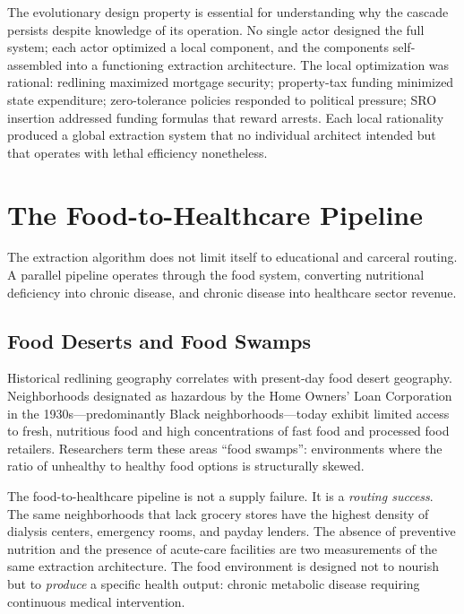 The evolutionary design property is essential for understanding why the cascade persists despite knowledge of its operation. No single actor designed the full system; each actor optimized a local component, and the components self-assembled into a functioning extraction architecture. The local optimization was rational: redlining maximized mortgage security; property-tax funding minimized state expenditure; zero-tolerance policies responded to political pressure; SRO insertion addressed funding formulas that reward arrests. Each local rationality produced a global extraction system that no individual architect intended but that operates with lethal efficiency nonetheless.

\section{The Food-to-Healthcare Pipeline}
\label{sec:food_healthcare}

The extraction algorithm does not limit itself to educational and carceral routing. A parallel pipeline operates through the food system, converting nutritional deficiency into chronic disease, and chronic disease into healthcare sector revenue.

\subsection{Food Deserts and Food Swamps}

Historical redlining geography correlates with present-day food desert geography. Neighborhoods designated as hazardous by the Home Owners' Loan Corporation in the 1930s---predominantly Black neighborhoods---today exhibit limited access to fresh, nutritious food and high concentrations of fast food and processed food retailers. Researchers term these areas ``food swamps'': environments where the ratio of unhealthy to healthy food options is structurally skewed.

The food-to-healthcare pipeline is not a supply failure. It is a \textit{routing success}. The same neighborhoods that lack grocery stores have the highest density of dialysis centers, emergency rooms, and payday lenders. The absence of preventive nutrition and the presence of acute-care facilities are two measurements of the same extraction architecture. The food environment is designed not to nourish but to \textit{produce} a specific health output: chronic metabolic disease requiring continuous medical intervention.

